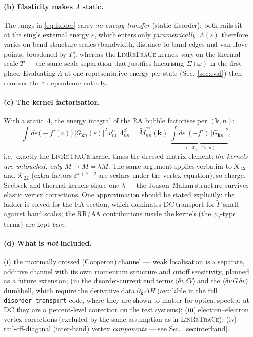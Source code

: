 \documentclass[11pt]{article}
\newcommand{\vk}{\mathbf{k}}
\newcommand{\eps}{\varepsilon}
\newcommand{\Gam}{\Gamma}
\begin{document}
\paragraph{(b) Elasticity makes $\Lambda$ static.}
The rungs in \eqref{eq:ladder} carry \emph{no energy transfer}
(static disorder): both rails sit at the single external energy $\eps$,
which enters only \emph{parametrically}.  $\Lambda(\eps)$ therefore
varies on band-structure scales (bandwidth, distance to band edges and
van-Hove points, broadened by $\tilde\Gam$), whereas the
\textsc{LinReTraCe} kernels vary on the thermal scale $T$ --- the same
scale separation that justifies linearising $\Sigma(\omega)$ in the
first place.  Evaluating $\Lambda$ at one representative energy per
state (Sec.~\ref{sec:eval}) then removes the $\eps$-dependence
entirely.

\paragraph{(c) The kernel factorisation.}
With a static $\Lambda$, the energy integral of the RA bubble
factorises per $(\vk,n)$:
\begin{equation}
\int\! d\eps\,\big({-}f'(\eps)\big)\,
\big|G_{\vk n}(\eps)\big|^{2}\,
\overline{v^{\alpha}_{nn}}\,\Lambda^{\beta}_{nn}
=\tilde M^{\alpha\beta}_{nn}(\vk)\;
\underbrace{\int\! d\eps\,({-}f')\,|G_{\vk n}|^{2}}_{\textstyle
\propto\;\mathcal K_{11}(\vk,n)},
\label{eq:factorize}
\end{equation}
i.e.\ exactly the \textsc{LinReTraCe} kernel times the dressed matrix
element: \emph{the kernels are untouched, only} $M\to\tilde M=\lambda M$.
The same argument applies verbatim to $\mathcal K_{12}$ and
$\mathcal K_{22}$ (extra factors $\eps^{a+b-2}$ are scalars under the
vertex equation), so charge, Seebeck and thermal kernels share one
$\lambda$ --- the Jonson--Mahan structure survives elastic vertex
corrections.  One approximation should be stated explicitly: the
ladder is solved for the RA section, which dominates DC transport for
$\tilde\Gam$ small against band scales; the RR/AA contributions inside
the kernels (the $\psi_2$-type terms) are kept \emph{bare}.

\paragraph{(d) What is \emph{not} included.}
\label{sec:notincluded}
(i) the maximally crossed (Cooperon) channel --- weak localisation is a
separate, additive channel with its own momentum structure and
cutoff sensitivity, planned as a future extension; (ii) the
disorder-current end terms $\langle\delta v\,\delta V\rangle$ and the
$\langle\delta v\,G\,\delta v\rangle$ dumbbell, which require the
derivative data $\partial_\vk\Delta H$ (available in the full
\texttt{disorder\_transport} code, where they are shown to matter for
optical spectra; at DC they are a percent-level correction on the test
systems); (iii) electron--electron vertex corrections (excluded by the
same assumption as in \textsc{LinReTraCe}); (iv) rail-off-diagonal
(inter-band) vertex \emph{components} --- see
Sec.~\ref{sec:interband}.
\end{document}
